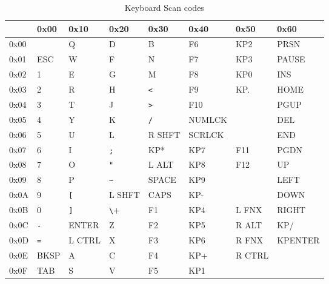 \begin{table}[ht]
    \begin{center}
        \begin{tabular}{|l||l|l|l|l|l|l|l|} \hline
                 & 0x00     & 0x10      & 0x20      & 0x30     & 0x40   & 0x50   & 0x60    \\ \hline\hline
            0x00 &          &    Q      &    D      &    B     &   F6   &  KP2   & PRSN    \\ \hline
            0x01 & ESC      &    W      &    F      &    N     &   F7   &  KP3   & PAUSE   \\ \hline
            0x02 & 1	    &    E      & G         & M        & F8     &  KP0   & INS     \\ \hline
            0x03 & 2	    &    R      & H         & \verb+<+ & F9     &  KP.   & HOME    \\ \hline
            0x04 & 3	    &    T      & J         & \verb+>+ & F10    &        & PGUP    \\ \hline
            0x05 & 4	    &    Y      & K         & \verb+/+ & NUMLCK &        & DEL     \\ \hline
            0x06 & 5	    &    U      & L         & R SHFT   & SCRLCK &        & END     \\ \hline
            0x07 & 6	    &    I      & \verb+;+  & KP*      & KP7    & F11    & PGDN    \\ \hline
            0x08 & 7	    &    O      & \verb+"+  & L ALT    & KP8    & F12    & UP      \\ \hline
            0x09 & 8        &    P      & \verb+~+  & SPACE    & KP9    &        & LEFT    \\ \hline
            0x0A & 9        & \verb+[+  & L SHFT    & CAPS     & KP-    &        & DOWN    \\ \hline
            0x0B & 0        & \verb+]+  & \verb+\+  & F1       & KP4    & L FNX  & RIGHT   \\ \hline
            0x0C & \verb+-+ & ENTER     & Z         & F2       & KP5    & R ALT  & KP/     \\ \hline
            0x0D & \verb+=+ & L CTRL    & X         & F3       & KP6    & R FNX  & KPENTER \\ \hline
            0x0E & BKSP     & A         & C         & F4       & KP+    & R CTRL &         \\ \hline
            0x0F & TAB      & S         & V         & F5       & KP1    &        &         \\ \hline
        \end{tabular}
    \end{center}
    \caption{Keyboard Scan codes}
    \label{tbl:kbd_scancodes}
\end{table}


